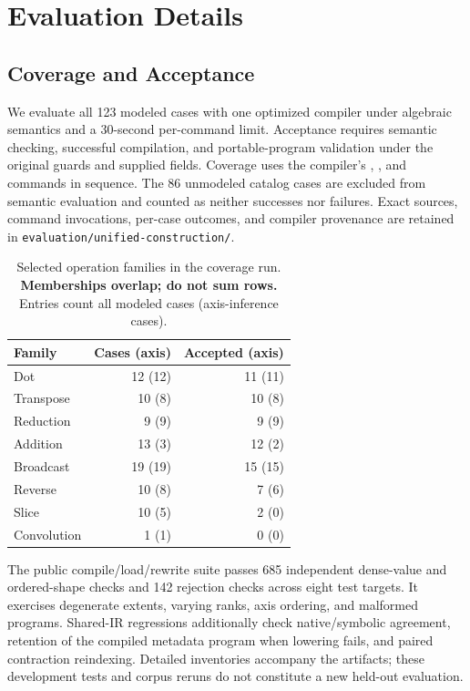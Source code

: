 \section{Evaluation Details}
\label{app:current-evaluation}
\subsection{Coverage and Acceptance}
\label{app:evaluation-coverage}
We evaluate all 123 modeled cases with one optimized compiler under
algebraic semantics and a 30-second per-command limit. Acceptance requires
semantic checking, successful compilation, and portable-program validation
under the original guards and supplied fields. Coverage uses the compiler's
, , and  commands in sequence.
The 86 unmodeled catalog cases are excluded from
semantic evaluation and counted as neither successes nor failures.
Exact sources, command invocations, per-case outcomes, and compiler provenance are retained in
\nolinkurl{evaluation/unified-construction/}.

\begin{table}[!htbp]
\caption{Selected operation families in the coverage run.
\textbf{Memberships overlap; do not sum rows.} Entries count all modeled cases (axis-inference cases).}
\label{tab:current-operation-families}
\small
\begin{tabularx}{\linewidth}{@{}Yrr@{}}\toprule
Family & Cases (axis) & Accepted (axis)\\\midrule
Dot & 12 (12) & 11 (11)\\
Transpose & 10 (8) & 10 (8)\\
Reduction & 9 (9) & 9 (9)\\
Addition & 13 (3) & 12 (2)\\
Broadcast & 19 (19) & 15 (15)\\
Reverse & 10 (8) & 7 (6)\\
Slice & 10 (5) & 2 (0)\\
Convolution & 1 (1) & 0 (0)\\\bottomrule
\end{tabularx}
\end{table}
The public compile/load/rewrite suite passes 685 independent dense-value
and ordered-shape checks and 142 rejection checks across eight test targets.
It exercises degenerate extents, varying ranks, axis ordering, and malformed
programs. Shared-IR regressions additionally check native/symbolic agreement,
retention of the compiled metadata program when lowering fails, and paired
contraction reindexing. Detailed
inventories accompany the artifacts; these development tests and corpus
reruns do not constitute a new held-out evaluation.

